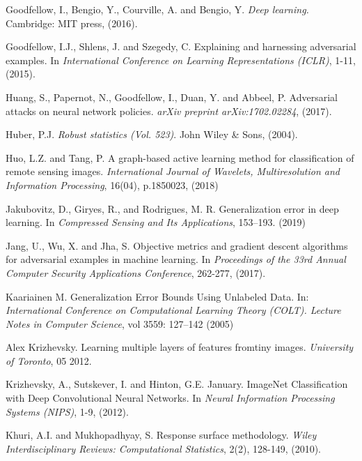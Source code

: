 \documentclass[12pt]{article}
\begin{document}
\begin{thebibliography}{}
Goodfellow, I., Bengio, Y., Courville, A. and Bengio, Y. {\it Deep learning.} Cambridge: MIT press, (2016).

Goodfellow, I.J., Shlens, J. and Szegedy, C. Explaining and harnessing
adversarial examples. In {\it   International Conference on Learning
  Representations (ICLR)}, 1-11, (2015).  

Huang, S., Papernot, N., Goodfellow, I., Duan, Y. and Abbeel,
P. Adversarial attacks on neural network policies. {\it arXiv preprint
  arXiv:1702.02284}, (2017).   

Huber, P.J. {\it Robust statistics (Vol. 523)}. John Wiley \& Sons, (2004). 

 Huo, L.Z. and Tang, P. A graph-based active learning method
 for classification of remote sensing images. {\it International Journal of
 Wavelets, Multiresolution and Information Processing}, 16(04),
 p.1850023, (2018)  

 Jakubovitz, D., Giryes, R., and Rodrigues, M. R.  Generalization
 error in deep learning. In {\it Compressed Sensing and Its
   Applications}, 153--193. (2019) 
 
  Jang, U., Wu, X. and Jha, S. Objective metrics and
  gradient descent algorithms for adversarial examples in machine
  learning. In {\it Proceedings of the 33rd Annual Computer Security
  Applications Conference}, 262-277, (2017).

  
  
  Kaariainen M. Generalization Error Bounds Using Unlabeled Data. In:
  {\it International Conference on Computational Learning Theory (COLT). Lecture Notes in
  Computer Science}, vol 3559: 127--142 (2005)

 Alex Krizhevsky. Learning multiple layers of features fromtiny
 images. {\it University of Toronto}, 05 2012. 
  
Krizhevsky, A., Sutskever, I. and Hinton, G.E. 
January. ImageNet Classification with Deep Convolutional Neural
Networks. In {\it Neural Information Processing Systems (NIPS)}, 1-9, (2012).  
  
Khuri, A.I. and Mukhopadhyay, S. Response surface methodology. {\it Wiley
Interdisciplinary Reviews: Computational Statistics}, 2(2),
128-149, (2010).


\end{thebibliography}
\end{document}
